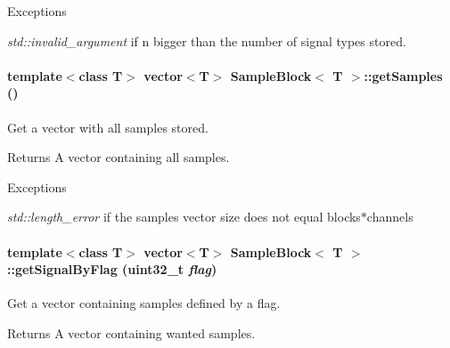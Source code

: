\begin{DoxyExceptions}{Exceptions}
\item[{\em std::invalid\_\-argument}]if n bigger than the number of signal types stored. \end{DoxyExceptions}
\hypertarget{class_sample_block_ab1764078cb18780d0d134494ee8aeb9e}{
\paragraph[{getSamples}]{\setlength{\rightskip}{0pt plus 5cm}template$<$class T$>$ vector$<$T$>$ {\bf SampleBlock}$<$ T $>$::getSamples ()}\hfill}
\label{class_sample_block_ab1764078cb18780d0d134494ee8aeb9e}


Get a vector with all samples stored. \begin{DoxyReturn}{Returns}
A vector containing all samples. 
\end{DoxyReturn}

\begin{DoxyExceptions}{Exceptions}
\item[{\em std::length\_\-error}]if the samples vector size does not equal blocks$\ast$channels \end{DoxyExceptions}
\hypertarget{class_sample_block_a2a2d427f69288002f5c5512f9e9a3d83}{
\paragraph[{getSignalByFlag}]{\setlength{\rightskip}{0pt plus 5cm}template$<$class T$>$ vector$<$T$>$ {\bf SampleBlock}$<$ T $>$::getSignalByFlag (uint32\_\-t {\em flag})}\hfill}
\label{class_sample_block_a2a2d427f69288002f5c5512f9e9a3d83}


Get a vector containing samples defined by a flag. \begin{DoxyReturn}{Returns}
A vector containing wanted samples. 
\end{DoxyReturn}

